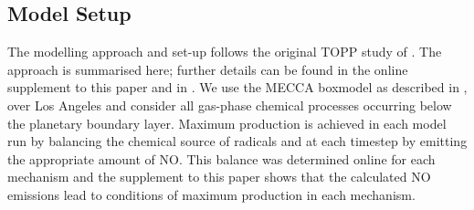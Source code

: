 \subsection{Model Setup} \label{ss:model_setup}
%
The modelling approach and set-up follows the original TOPP study of \citet{Butler:2011}.
The approach is summarised here; further details can be found in the online supplement to this paper and in \citet{Butler:2011}. 
We use the MECCA boxmodel \citep{Sander:2005} as described in \citet{Butler:2011}, over Los Angeles and consider all gas-phase chemical processes occurring below the planetary boundary layer.
Maximum  production is achieved in each model run by balancing the chemical source of radicals and  at each timestep by emitting the appropriate amount of NO.
This balance was determined online for each mechanism and the supplement to this paper shows that the calculated NO emissions lead to conditions of maximum  production in each mechanism.

